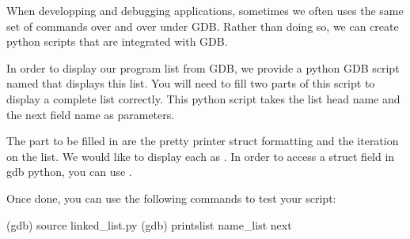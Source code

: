 When developping and debugging applications, sometimes we often uses the same
set of commands over and over under GDB. Rather than doing so, we can create 
python scripts that are integrated with GDB.

In order to display our program list from GDB, we provide a python GDB script
named  that displays this list. You will need to fill two
parts of this script to display a complete list correctly. This python script
takes the list head name and the next field name as parameters.

The part to be filled in are the pretty printer struct formatting and the
iteration on the list. We would like to display each  as
. In order to access a struct field in gdb python, you can use
.

Once done, you can use the following commands to test your script:

\begin{bashinput}
(gdb) source linked_list.py
(gdb) printslist name_list next
\end{bashinput}
